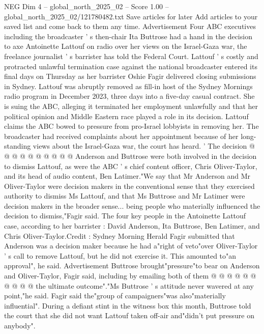 \begin{textsample}{NEG Dim 4 – global\_north\_2025\_02 – Score 1.00 – global\_north\_2025\_02/121780482.txt}  \label{ex:f4_neg_402}
Save articles for later Add articles to your saved list and come back to them any time.
Advertisement Four ABC executives including the broadcaster ' s then-chair Ita Buttrose had a hand in the decision to axe Antoinette Lattouf on radio over her views on the Israel-Gaza war, the freelance journalist ' s barrister has told the Federal Court.
Lattouf ' s costly and protracted unlawful termination case against the national broadcaster entered its final days on Thursday as her barrister Oshie Fagir delivered closing submissions in Sydney.
Lattouf was abruptly removed as fill-in host of the Sydney Mornings radio program in December 2023, three days into a five-day casual contract.
She is suing the ABC, alleging it terminated her employment unlawfully and that her political opinion and Middle Eastern race played a role in its decision.
Lattouf claims the ABC bowed to pressure from pro-Israel lobbyists in removing her.
The broadcaster had received complaints about her appointment because of her long-standing views about the Israel-Gaza war, the court has heard. ' The decision @ @ @ @ @ @ @ @ @ @ Anderson and Buttrose were both involved in the decision to dismiss Lattouf, as were the ABC ' s chief content officer, Chris Oliver-Taylor, and its head of audio content, Ben Latimer."We say that Mr Anderson and Mr Oliver-Taylor were decision makers in the conventional sense that they exercised authority to dismiss Ms Lattouf, and that Ms Buttrose and Mr Latimer were decision makers in the broader sense... being people who materially influenced the decision to dismiss,"Fagir said.
The four key people in the Antoinette Lattouf case, according to her barrister : David Anderson, Ita Buttrose, Ben Latimer, and Chris Oliver-Taylor.Credit : Sydney Morning Herald Fagir submitted that Anderson was a decision maker because he had a"right of veto"over Oliver-Taylor ' s call to remove Lattouf, but he did not exercise it.
This amounted to"an approval", he said.
Advertisement Buttrose brought"pressure"to bear on Anderson and Oliver-Taylor, Fagir said, including by emailing both of them @ @ @ @ @ @ @ @ @ @ the ultimate outcome"."Ms Buttrose ' s attitude never wavered at any point,"he said.
Fagir said the"group of campaigners"was also"materially influential".
During a defiant stint in the witness box this month, Buttrose told the court that she did not want Lattouf taken off-air and"didn't put pressure on anybody".

\end{textsample}
